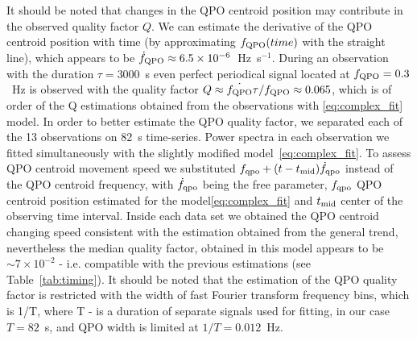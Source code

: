 \documentclass[a4paper,fleqn,usenatbib]{mnras}
\begin{document}
It should be noted that  changes in the QPO centroid position may contribute in the observed quality factor $Q$.
We can estimate the derivative of the QPO centroid position with time (by approximating $f_{\rm QPO}(time)$ with the straight line), which appears to be $\dot{f}_{\rm QPO} \approx 6.5\times10^{-6}$~Hz~s$^{-1}$. 
During an observation with the duration $\tau = 3000$~s even perfect periodical signal located at $f_{\rm QPO}=0.3$~Hz is observed with the quality factor $Q \approx \dot{f_{\rm QPO}}\tau/f_{\rm QPO} \approx 0.065$, which is of order of the Q estimations obtained from the observations with \ref{eq:complex_fit} model.
In order to better estimate the QPO quality factor, we separated each of the 13 observations on 82~s time-series. 
Power spectra in each observation we fitted simultaneously with the slightly modified model~\ref{eq:complex_fit}.
To assess QPO centroid movement speed we substituted $f_{\rm qpo} + (t - t_{\rm mid})\dot{f}_{\rm qpo}$ instead of the QPO centroid frequency, with $\dot{f}_{\rm qpo}$ being the free parameter, $f_{\rm qpo}$ QPO centroid position estimated for the model\ref{eq:complex_fit}  and $t_{\rm mid}$ center of the observing time interval. 
Inside each data set we obtained the QPO centroid changing speed consistent with the estimation obtained from the general trend, nevertheless the median quality factor, obtained in this model appears to be $\sim7\times10^{-2}$ - i.e. compatible with the previous estimations (see Table~\ref{tab:timing}). 
It should be noted that the estimation of the QPO quality factor is restricted with the width of fast Fourier transform frequency bins, which is 1/T, where T - is a duration of separate signals used for fitting, in our case $T=82$~s, and QPO width is limited at $1/T = 0.012$~Hz.
\end{document}
